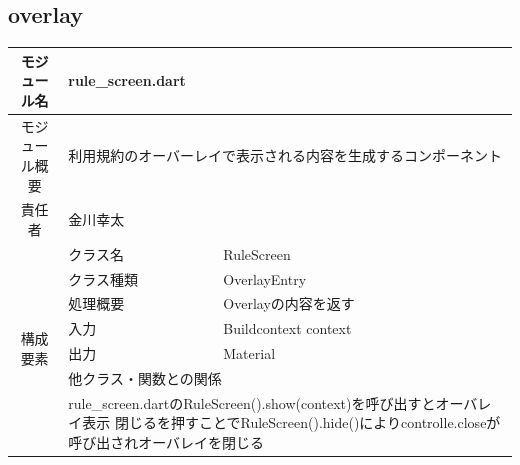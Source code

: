 \subsection{overlay}\label{sec:overlay}


\begin{table}[H]
  \centering
  \begin{tabular}{|c|l|l|} \hline
    モジュール名                & \multicolumn{2}{l|}{rule\_screen.dart}                                                                                         \\ \hline
    モジュール概要               & \multicolumn{2}{p{12cm}|}{利用規約のオーバーレイで表示される内容を生成するコンポーネント}                                                                     \\ \hline
    責任者                   & \multicolumn{2}{l|}{金川幸太}                                                                                                      \\ \hline
    \multirow{7}{*}{構成要素} & クラス名                                                                                & RuleScreen                               \\ \cline{2-3}
                          & クラス種類                                                                               & OverlayEntry                             \\ \cline{2-3}
                          & 処理概要                                                                                & \multicolumn{1}{p{12cm}|}{Overlayの内容を返す} \\ \cline{2-3}
                          & 入力                                                                                  & Buildcontext context                     \\ \cline{2-3}
                          & 出力                                                                                  & Material                                 \\ \cline{2-3}
                          & \multicolumn{2}{l|}{他クラス・関数との関係}                                                                                               \\ \cline{2-3}
                          & \multicolumn{2}{p{14cm}|}{rule\_screen.dartのRuleScreen().show(context)を呼び出すとオーバレイ表示
    \newline 閉じるを押すことでRuleScreen().hide()によりcontrolle.closeが呼び出されオーバレイを閉じる}                                                                                \\ \hline
  \end{tabular}
\end{table}


